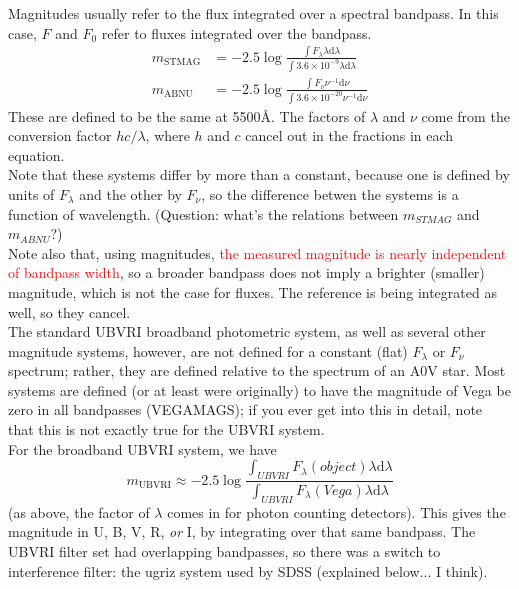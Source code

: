\documentclass[12pt]{article}
\begin{document}
\noindent Magnitudes usually refer to the flux integrated over a
spectral bandpass. In this case, $F$ and $F_0$ refer to fluxes
integrated over the bandpass.
\begin{align*}
    m_{\textrm{STMAG}} &= -2.5 \log \frac{\int F_{\lambda} \lambda
    \textrm{d}\lambda}{\int3.6\times10^{-9}\lambda\textrm{d}\lambda}\\
    m_{\textrm{ABNU}} &= -2.5 \log \frac{\int F_{\nu}\nu^{-1}
\textrm{d}\nu}{\int 3.6 \times 10^{-20}\nu^{-1}\textrm{d}\nu}
\end{align*}
These are defined to be the same at 5500\AA{}.
The factors of $\lambda$ and $\nu$ come from the conversion factor
$hc/\lambda$, where $h$ and $c$ cancel out in the
fractions in each equation.\\

\noindent Note that these systems differ by more than a constant,
because one is defined by units of $F_{\lambda}$ and the other by $F_{\nu}$,
so the difference betwen the systems is a function of wavelength.
(Question: what's the relations between $m_{STMAG}$ and $m_{ABNU}$?)\\

\noindent Note also that, using magnitudes,
\textcolor{red}{the measured magnitude is
nearly independent of bandpass width}, so a broader bandpass does not
imply a brighter (smaller) magnitude, which is not the case for
fluxes. The reference is being integrated as well, so they cancel.\\

\noindent The standard UBVRI broadband photometric system, as well as
several other magnitude systems, however, are not defined for a
constant (flat) $F_{\lambda}$ or $F_{\nu}$ spectrum; rather, they are defined
relative to the spectrum of an A0V star. Most systems are defined (or
at least were originally) to have the magnitude of Vega be zero in all
bandpasses (VEGAMAGS); if you ever get into this in detail, note that
this is not exactly true for the UBVRI system.\\

\noindent For the broadband UBVRI system, we have
\begin{equation*}
    m_{\textrm{UBVRI}} \approx -2.5 \log
    \frac{\int_{UBVRI}F_{\lambda}(object)\lambda\textrm{d}\lambda}
    {\int_{UBVRI}F_{\lambda}(Vega)\lambda\textrm{d}\lambda}
\end{equation*}
(as above, the factor of $\lambda$ comes in for photon counting
detectors). This gives the magnitude in U, B, V, R, \emph{or} I,
by integrating over that same bandpass.
The UBVRI filter set had overlapping bandpasses, so
there was a switch to interference filter: the ugriz system used
by SDSS (explained below... I think).\\
\end{document}
